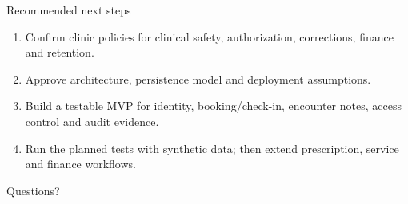 ﻿\documentclass[aspectratio=169,10pt]{beamer}
\begin{document}
\begin{frame}{Recommended next steps}
  \begin{enumerate}
    \item Confirm clinic policies for clinical safety, authorization, corrections, finance and retention.
    \item Approve architecture, persistence model and deployment assumptions.
    \item Build a testable MVP for identity, booking/check-in, encounter notes, access control and audit evidence.
    \item Run the planned tests with synthetic data; then extend prescription, service and finance workflows.
  \end{enumerate}
  \vfill
  \centering\large Questions?
\end{frame}
\end{document}
